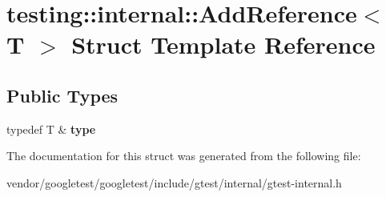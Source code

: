 \hypertarget{structtesting_1_1internal_1_1AddReference}{}\section{testing\+:\+:internal\+:\+:Add\+Reference$<$ T $>$ Struct Template Reference}
\label{structtesting_1_1internal_1_1AddReference}
\subsection*{Public Types}
\begin{DoxyCompactItemize}
\item 
typedef T \& {\bfseries type}\hypertarget{structtesting_1_1internal_1_1AddReference_a2df8dd7c4e41f6390e6e66b1a9a67bb4}{}\label{structtesting_1_1internal_1_1AddReference_a2df8dd7c4e41f6390e6e66b1a9a67bb4}

\end{DoxyCompactItemize}


The documentation for this struct was generated from the following file\+:\begin{DoxyCompactItemize}
\item 
vendor/googletest/googletest/include/gtest/internal/gtest-\/internal.\+h\end{DoxyCompactItemize}
